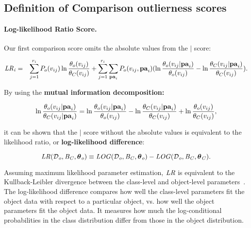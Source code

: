 {\subsection{Definition of Comparison outlierness scores}

\paragraph{Log-likelihood Ratio Score.} Our first comparison score omits the absolute values from the $\mid$ score: 

\begin{eqnarray*}
\it{LR}_{i} & = & \sum_{j=1}^{r_{i}} P_{o}(v_{ij}) \ln \frac{\theta_{o}( v_{ij})}{\theta_{C}( v_{ij})}+ \sum_{j=1}^{r_{i}} \sum_{\mathbf{pa}_{i}} 
P_{o}( v_{ij},\mathbf{pa}_{i})
(\ln \frac{\theta_{o}( v_{ij}|\mathbf{pa}_{i})}{\theta_{o}(v_{ij})} - \ln \frac{\theta_{C}( v_{ij}|\mathbf{pa}_{i})}{\theta_{C}(v_{ij})}).
\end{eqnarray*}

By using the \textbf{mutual information decomposition:}


\begin{equation} \label{eq:decompose}
\ln \frac{\theta_{o}( v_{ij}|\mathbf{pa}_{i})}{\theta_{C}( v_{ij}|\mathbf{pa}_{i})} = \ln \frac{\theta_{o}(v_{ij}|\mathbf{pa}_{i})}{\theta_{o}(v_{ij})} - \ln \frac{\theta_{C}( v_{ij}|\mathbf{pa}_{i})}{\theta_{C}(v_{ij})} + \ln \frac{\theta_{o}( v_{ij})}{\theta_{C}( v_{ij})},
\end{equation}

\noindent it can be shown that the $\mid$ score without the absolute values is equivalent to 
the likelihood ratio, or {\bf log-likelihood difference}:

\begin{equation} \label{eq:log-diff}
\it{LR}(\mathcal{D}_{o},B_{C},\boldsymbol{\theta}_{o}) \equiv \it{LOG}(\mathcal{D}_{o},B_{C},\boldsymbol{\theta}_{o}) - \it{LOG}(\mathcal{D}_{o},B_{C},\boldsymbol{\theta}_{C}).
\end{equation}

Assuming maximum likelihood parameter estimation, $\it{LR}$ is equivalent to the Kullback-Leibler divergence between the class-level and object-level parameters~\citep{Campos2006}. The log-likelihood difference compares  how well the class-level parameters fit the object data with respect to a particular object, vs. how well the object parameters fit the object data. It measures how much the log-conditional probabilities in the class distribution differ from those in the object distribution. 
%
}
